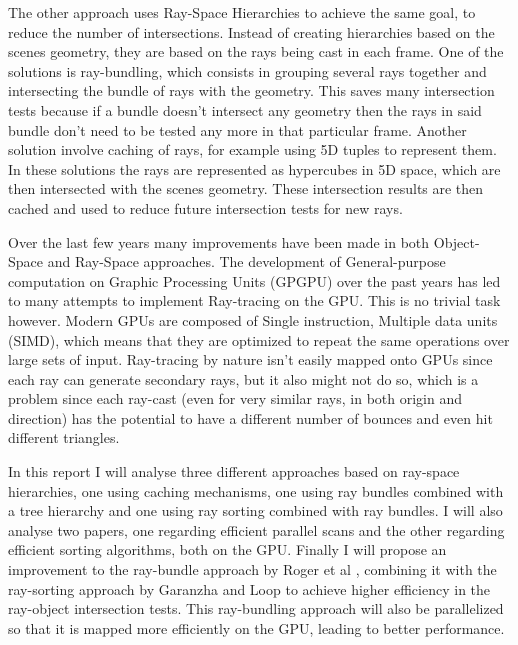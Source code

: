 \documentclass{llncs}
\begin{document}
\medskip

The other approach uses Ray-Space Hierarchies to achieve the same goal, to reduce the number of intersections. Instead of creating hierarchies based on the scenes geometry, they are based on the rays being cast in each frame. One of the solutions is ray-bundling, which consists in grouping several rays together and intersecting the bundle of rays with the geometry. This saves many intersection tests because if a bundle doesn't intersect any geometry then the rays in said bundle don't need to be tested any more in that particular frame. Another solution involve caching of rays, for example using 5D tuples to represent them. In these solutions the rays are represented as hypercubes in 5D space, which are then intersected with the scenes geometry. These intersection results are then cached and used to reduce future intersection tests for new rays.

\medskip

Over the last few years many improvements have been made in both Object-Space and Ray-Space approaches. The development of General-purpose computation on Graphic Processing Units (GPGPU) over the past years has led to many attempts to implement Ray-tracing on the GPU. This is no trivial task however. Modern GPUs are composed of Single instruction, Multiple data units (SIMD), which means that they are optimized to repeat the same operations over large sets of input. Ray-tracing by nature isn't easily mapped onto GPUs since each ray can generate secondary rays, but it also might not do so, which is a problem since each ray-cast (even for very similar rays, in both origin and direction) has the potential to have a different number of bounces and even hit different triangles.

\medskip

In this report I will analyse three different approaches based on ray-space hierarchies, one using caching mechanisms, one using ray bundles combined with a tree hierarchy and one using ray sorting combined with ray bundles. I will also analyse two papers, one regarding efficient parallel scans and the other regarding efficient sorting algorithms, both on the GPU. Finally I will propose an improvement to the ray-bundle approach by Roger et al \cite{Roger07}, combining it with the ray-sorting approach by Garanzha and Loop \cite{GaranzhaLoop10} to achieve higher efficiency in the ray-object intersection tests. This ray-bundling approach will also be parallelized so that it is mapped more efficiently on the GPU, leading to better performance.
\end{document}
